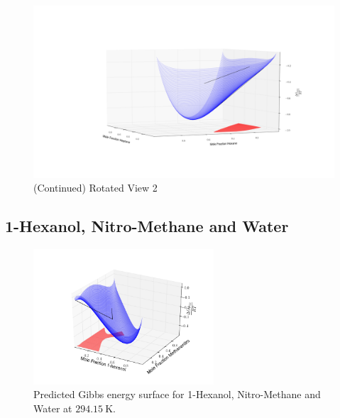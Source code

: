 \begin{figure}[hp]
\vspace{40pt}
\ContinuedFloat
\centering
\includegraphics[width = \textwidth, bb=100 100 1600 700]{Results_Parts/TernaryParams/heptane-hexane-methanol/DWPMTieline3and-2/rotation4.png}
\caption[]{(Continued) Rotated View 2}
\end{figure}

\clearpage
\subsection{1-Hexanol, Nitro-Methane and Water}

\begin{figure}[hp]
\centering
\includegraphics[width = 0.6\textwidth, bb=100 0 500 400]{Results_Parts/TernaryParams/1-hexanol-methanenitro-water/DWPM/294.15/PredictedGibbsWireframe.png}
\caption{Predicted Gibbs energy surface for 1-Hexanol, Nitro-Methane and Water at $294.15~\mathrm{K}$.}
\end{figure}	


